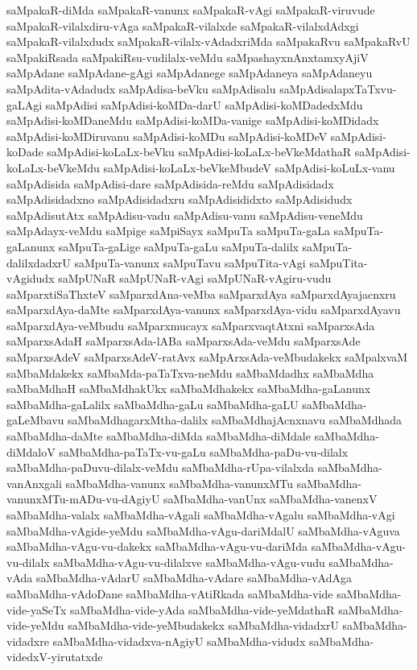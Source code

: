 {saMpakaR-diMda
saMpakaR-vanunx
saMpakaR-vAgi
saMpakaR-viruvude
saMpakaR-vilalxdiru-vAga
saMpakaR-vilalxde
saMpakaR-vilalxdAdxgi
saMpakaR-vilalxdudx
saMpakaR-vilalx-vAdadxriMda
saMpakaRvu
saMpakaRvU
saMpakiRsada
saMpakiRsu-vudilalx-veMdu
saMpashayxnAnxtamxyAjiV
saMpAdane
saMpAdane-gAgi
saMpAdanege
saMpAdaneya
saMpAdaneyu
saMpAdita-vAdadudx
saMpAdisa-beVku
saMpAdisalu
saMpAdisalapxTaTxvu-gaLAgi
saMpAdisi
saMpAdisi-koMDa-darU
saMpAdisi-koMDadedxMdu
saMpAdisi-koMDaneMdu
saMpAdisi-koMDa-vanige
saMpAdisi-koMDidadx
saMpAdisi-koMDiruvanu
saMpAdisi-koMDu
saMpAdisi-koMDeV
saMpAdisi-koDade
saMpAdisi-koLaLx-beVku
saMpAdisi-koLaLx-beVkeMdathaR
saMpAdisi-koLaLx-beVkeMdu
saMpAdisi-koLaLx-beVkeMbudeV
saMpAdisi-koLuLx-vanu
saMpAdisida
saMpAdisi-dare
saMpAdisida-reMdu
saMpAdisidadx
saMpAdisidadxno
saMpAdisidadxru
saMpAdisididxto
saMpAdisidudx
saMpAdisutAtx
saMpAdisu-vadu
saMpAdisu-vanu
saMpAdisu-veneMdu
saMpAdayx-veMdu
saMpige
saMpiSayx
saMpuTa
saMpuTa-gaLa
saMpuTa-gaLanunx
saMpuTa-gaLige
saMpuTa-gaLu
saMpuTa-dalilx
saMpuTa-dalilxdadxrU
saMpuTa-vanunx
saMpuTavu
saMpuTita-vAgi
saMpuTita-vAgidudx
saMpUNaR
saMpUNaR-vAgi
saMpUNaR-vAgiru-vudu
saMparxtiSaThxteV
saMparxdAna-veMba
saMparxdAya
saMparxdAyajacnxru
saMparxdAya-daMte
saMparxdAya-vanunx
saMparxdAya-vidu
saMparxdAyavu
saMparxdAya-veMbudu
saMparxmucayx
saMparxvaqtAtxni
saMparxsAda
saMparxsAdaH
saMparxsAda-lABa
saMparxsAda-veMdu
saMparxsAde
saMparxsAdeV
saMparxsAdeV-ratAvx
saMpArxsAda-veMbudakekx
saMpalxvaM
saMbaMdakekx
saMbaMda-paTaTxva-neMdu
saMbaMdadhx
saMbaMdha
saMbaMdhaH
saMbaMdhakUkx
saMbaMdhakekx
saMbaMdha-gaLanunx
saMbaMdha-gaLalilx
saMbaMdha-gaLu
saMbaMdha-gaLU
saMbaMdha-gaLeMbavu
saMbaMdhagarxMtha-dalilx
saMbaMdhajAcnxnavu
saMbaMdhada
saMbaMdha-daMte
saMbaMdha-diMda
saMbaMdha-diMdale
saMbaMdha-diMdaloV
saMbaMdha-paTaTx-vu-gaLu
saMbaMdha-paDu-vu-dilalx
saMbaMdha-paDuvu-dilalx-veMdu
saMbaMdha-rUpa-vilalxda
saMbaMdha-vanAnxgali
saMbaMdha-vanunx
saMbaMdha-vanunxMTu
saMbaMdha-vanunxMTu-mADu-vu-dAgiyU
saMbaMdha-vanUnx
saMbaMdha-vanenxV
saMbaMdha-valalx
saMbaMdha-vAgali
saMbaMdha-vAgalu
saMbaMdha-vAgi
saMbaMdha-vAgide-yeMdu
saMbaMdha-vAgu-dariMdalU
saMbaMdha-vAguva
saMbaMdha-vAgu-vu-dakekx
saMbaMdha-vAgu-vu-dariMda
saMbaMdha-vAgu-vu-dilalx
saMbaMdha-vAgu-vu-dilalxve
saMbaMdha-vAgu-vudu
saMbaMdha-vAda
saMbaMdha-vAdarU
saMbaMdha-vAdare
saMbaMdha-vAdAga
saMbaMdha-vAdoDane
saMbaMdha-vAtiRkada
saMbaMdha-vide
saMbaMdha-vide-yaSeTx
saMbaMdha-vide-yAda
saMbaMdha-vide-yeMdathaR
saMbaMdha-vide-yeMdu
saMbaMdha-vide-yeMbudakekx
saMbaMdha-vidadxrU
saMbaMdha-vidadxre
saMbaMdha-vidadxva-nAgiyU
saMbaMdha-vidudx
saMbaMdha-videdxV-yirutatxde
}
